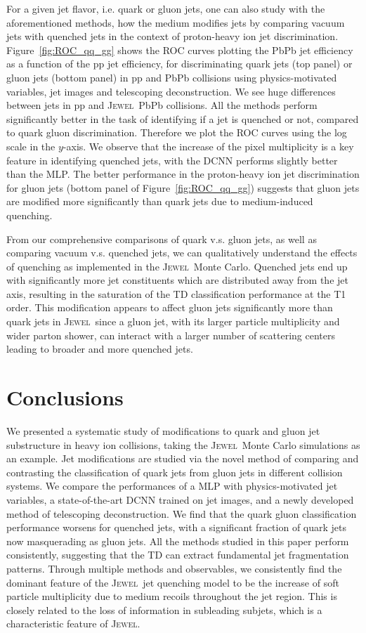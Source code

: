 \documentclass[notoc,preprintnumbers]{JHEP3}
\newcommand{\jw}{\textsc{Jewel}~}
\begin{document}
For a given jet flavor, i.e. quark or gluon jets, one can also study with the aforementioned methods, how the medium modifies jets by comparing vacuum jets with quenched jets in the context of proton-heavy ion jet discrimination. Figure~\ref{fig:ROC_qq_gg} shows the ROC curves plotting the PbPb jet efficiency as a function of the pp jet efficiency, for discriminating quark jets (top panel) or gluon jets (bottom panel) in pp and PbPb collisions using physics-motivated variables, jet images and telescoping deconstruction. We see huge differences between jets in pp and \jw PbPb collisions. All the methods perform significantly better in the task of identifying if a jet is quenched or not, compared to quark gluon discrimination. Therefore we plot the ROC curves using the log scale in the $y$-axis. We observe that the increase of the pixel multiplicity is a key feature in identifying quenched jets, with the DCNN performs slightly better than the MLP. The better performance in the proton-heavy ion jet discrimination for gluon jets (bottom panel of Figure~\ref{fig:ROC_qq_gg}) suggests that gluon jets are modified more significantly than quark jets due to medium-induced quenching.

From our comprehensive comparisons of quark v.s. gluon jets, as well as comparing vacuum v.s. quenched jets, we can qualitatively understand the effects of quenching as implemented in the \jw Monte Carlo. Quenched jets end up with significantly more jet constituents which are distributed away from the jet axis, resulting in the saturation of the TD classification performance at the T1 order. This modification appears to affect gluon jets significantly more than quark jets in \jw since a gluon jet, with its larger particle multiplicity and wider parton shower, can interact with a larger number of scattering centers leading to broader and more quenched jets. 

\section{Conclusions}
\label{sec:conc}

We presented a systematic study of modifications to quark and gluon jet substructure in heavy ion collisions, taking the \jw Monte Carlo simulations as an example. Jet modifications are studied via the novel method of comparing and contrasting the classification of quark jets from gluon jets in different collision systems. We compare the performances of a MLP with physics-motivated jet variables, a state-of-the-art DCNN trained on jet images, and a newly developed method of telescoping deconstruction. We find that the quark gluon classification performance worsens for quenched jets, with a significant fraction of quark jets now masquerading as gluon jets. All the methods studied in this paper perform consistently, suggesting that the TD can extract fundamental jet fragmentation patterns. Through multiple methods and observables, we consistently find the dominant feature of the \jw jet quenching model to be the increase of soft particle multiplicity due to medium recoils throughout the jet region. This is closely related to the loss of information in subleading subjets, which is a characteristic feature of \textsc{Jewel}.
\end{document}
